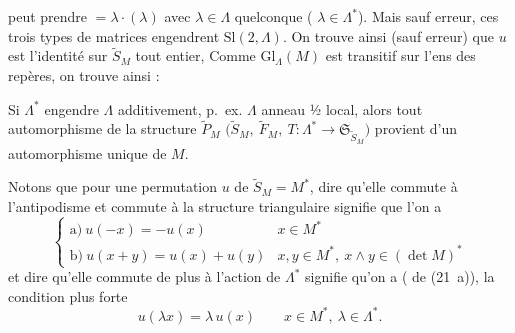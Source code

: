 \documentclass[11pt,a4paper]{article}
\begin{document}
peut prendre \ill{} $= \lambda\cdot(\lambda)$ avec $\lambda\in\Lambda$ quelconque
( $\lambda\in\Lambda^{*}$). Mais sauf erreur,
ces trois types de matrices engendrent $\mathrm{Sl}(2,\Lambda)$.
On trouve ainsi (sauf erreur) que $u$ est l'identité sur $\widetilde{S}_M$ tout entier,
Comme $\mathrm{Gl}_\Lambda(M)$ est transitif sur l'ens des repères, on trouve ainsi :

Si $\Lambda^{*}$ engendre $\Lambda$ additivement,  p.~ex. $\Lambda$ anneau
½ local, alors tout automorphisme de la structure
$\widetilde{P}_M$ $\bigl(\widetilde{S}_M,\ \widetilde{F}_M,\ T\colon \Lambda^{*}\to\mathfrak{S}_{\widetilde{S}_M}\bigr)$
provient d'un automorphisme unique de $M$.

Notons que pour une permutation $u$ de $\widetilde{S}_M = M^{*}$, dire qu'elle commute
à l'antipodisme et commute à la structure triangulaire signifie que l'on a
\[
\tag{21}
\begin{cases}
\text{a)}\ u(-x) = -u(x) & x\in M^{*}\\
\text{b)}\ u(x+y) = u(x)+u(y) & x,y \in M^{*},\ x\wedge y\in(\det M)^{*}
\end{cases}
\]
et dire qu'elle commute de plus à l'action de $\Lambda^{*}$ signifie qu'on a
(\ill{} de (21~a)), la condition plus forte
\[
\tag{22}
u(\lambda x) = \lambda\, u(x) \qquad x\in M^{*},\ \lambda\in\Lambda^{*}.
\]
\end{document}
